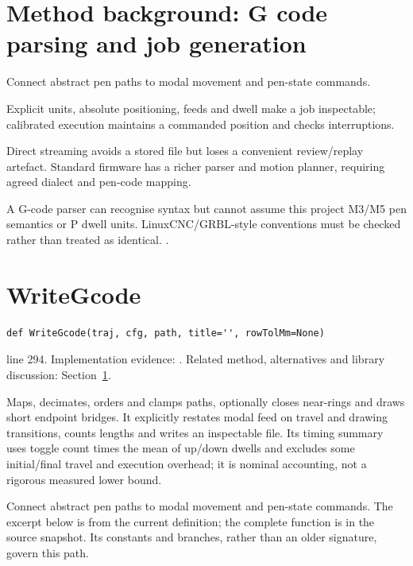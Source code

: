 \section{Method background: G code parsing and job generation}\label{method:gcode}
Connect abstract pen paths to modal movement and pen-state commands.


Explicit units, absolute positioning, feeds and dwell make a job inspectable; calibrated execution maintains a commanded position and checks interruptions.


Direct streaming avoids a stored file but loses a convenient review/replay artefact. Standard firmware has a richer parser and motion planner, requiring agreed dialect and pen-code mapping.


A G-code parser can recognise syntax but cannot assume this project M3/M5 pen semantics or P dwell units. LinuxCNC/GRBL-style conventions must be checked rather than treated as identical. \cite{code2026,linuxcnc}.


\section{WriteGcode}\label{fn:reproduce:WriteGcode}
\begin{lstlisting}[style=sig]
def WriteGcode(traj, cfg, path, title='', rowTolMm=None)
\end{lstlisting}
 line 294. Implementation evidence: \cite{code2026}. Related method, alternatives and library discussion: Section~\ref{method:gcode}.


Maps, decimates, orders and clamps paths, optionally closes near-rings and draws short endpoint bridges. It explicitly restates modal feed on travel and drawing transitions, counts lengths and writes an inspectable file. Its timing summary uses toggle count times the mean of up/down dwells and excludes some initial/final travel and execution overhead; it is nominal accounting, not a rigorous measured lower bound.


Connect abstract pen paths to modal movement and pen-state commands. The excerpt below is from the current definition; the complete function is in the source snapshot. Its constants and branches, rather than an older signature, govern this path.


